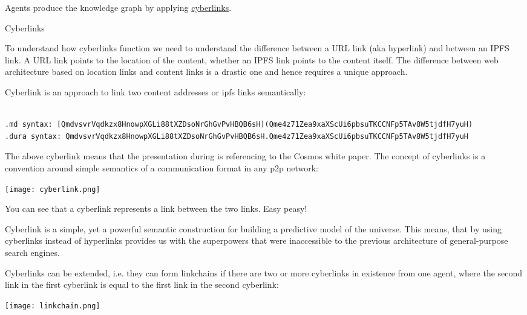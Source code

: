 \documentclass[8pt,oneside]{amsart}
\makeatletter
\newcommand{\linkred}[2]{\href{#1}{\color{red}{#2}}}
\renewcommand\subsection{\@startsection{subsection}
                                    {2}{\z@}
                                    {-3.25ex\@plus -1ex \@minus -.2ex}
                                    {0ex \@plus .2ex}
                                    {\play\Large}
                        }
\newcommand{\titleSection}[1]{\subsection{#1}}
\newenvironment{Figure}
  {\par\medskip\noindent\minipage{\linewidth}}
  {\endminipage\par\medskip}
\makeatother
\begin{document}
Agents produce the knowledge graph by applying {\hyperref[cyberlinks]{cyberlinks}}.

\titleSection{Cyberlinks}\label{cyberlinks}

To understand how cyberlinks function we need to understand the difference between a URL link (aka hyperlink) and between an IPFS link. A URL link points to the location of the content, whether an IPFS link points to the content itself. The difference between web architecture based on location links and content links is a drastic one and hence requires a unique approach.

{Cyberlink} is an approach to link two content addresses or {ipfs links} semantically:

\begin{lstlisting}

.md syntax: [QmdvsvrVqdkzx8HnowpXGLi88tXZDsoNrGhGvPvHBQB6sH](Qme4z71Zea9xaXScUi6pbsuTKCCNFp5TAv8W5tjdfH7yuH)
.dura syntax: QmdvsvrVqdkzx8HnowpXGLi88tXZDsoNrGhGvPvHBQB6sH.Qme4z71Zea9xaXScUi6pbsuTKCCNFp5TAv8W5tjdfH7yuH
\end{lstlisting}

The above cyberlink means that the \linkred{https://github.com/cybercongress/cyberd}{cyberd} presentation during \linkred{https://etherscan.io/token/0x61B81103e716B611Fff8aF5A5Dc8f37C628efb1E}{cyberc0n} is referencing to the Cosmos white paper. The concept of cyberlinks is a convention around simple semantics of a communication format in any p2p network:

\begin{Figure}
    \centering
    \texttt{[image: cyberlink.png]}
\end{Figure}

You can see that a cyberlink represents a link between the two links. Easy peasy!

Cyberlink is a simple, yet a powerful semantic construction for building a predictive model of the universe. This means, that by using cyberlinks instead of hyperlinks provides us with the superpowers that were inaccessible to the previous architecture of general-purpose search engines.

Cyberlinks can be extended, i.e. they can form linkchains if there are two or more cyberlinks in existence from one agent, where the second link in the first cyberlink is equal to the first link in the second cyberlink:

\begin{Figure}
    \centering
    \texttt{[image: linkchain.png]}
\end{Figure}
\end{document}
